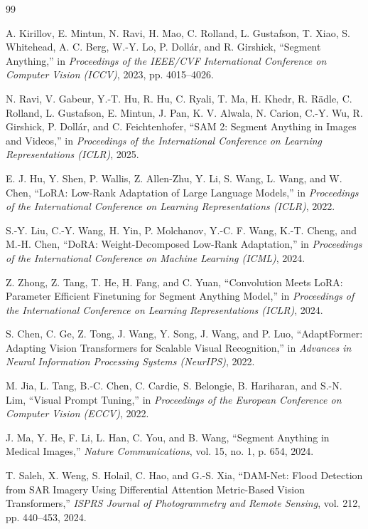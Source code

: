 \documentclass[11pt,a4paper,oneside]{report}
\begin{document}
\begin{thebibliography}{99}

A. Kirillov, E. Mintun, N. Ravi, H. Mao, C. Rolland, L. Gustafson, T. Xiao, S. Whitehead, A. C. Berg, W.-Y. Lo, P. Doll{\'a}r, and R. Girshick, ``Segment Anything,'' in \emph{Proceedings of the IEEE/CVF International Conference on Computer Vision (ICCV)}, 2023, pp. 4015--4026.

N. Ravi, V. Gabeur, Y.-T. Hu, R. Hu, C. Ryali, T. Ma, H. Khedr, R. R{\"a}dle, C. Rolland, L. Gustafson, E. Mintun, J. Pan, K. V. Alwala, N. Carion, C.-Y. Wu, R. Girshick, P. Doll{\'a}r, and C. Feichtenhofer, ``SAM 2: Segment Anything in Images and Videos,'' in \emph{Proceedings of the International Conference on Learning Representations (ICLR)}, 2025.

E. J. Hu, Y. Shen, P. Wallis, Z. Allen-Zhu, Y. Li, S. Wang, L. Wang, and W. Chen, ``LoRA: Low-Rank Adaptation of Large Language Models,'' in \emph{Proceedings of the International Conference on Learning Representations (ICLR)}, 2022.

S.-Y. Liu, C.-Y. Wang, H. Yin, P. Molchanov, Y.-C. F. Wang, K.-T. Cheng, and M.-H. Chen, ``DoRA: Weight-Decomposed Low-Rank Adaptation,'' in \emph{Proceedings of the International Conference on Machine Learning (ICML)}, 2024.

Z. Zhong, Z. Tang, T. He, H. Fang, and C. Yuan, ``Convolution Meets LoRA: Parameter Efficient Finetuning for Segment Anything Model,'' in \emph{Proceedings of the International Conference on Learning Representations (ICLR)}, 2024.

S. Chen, C. Ge, Z. Tong, J. Wang, Y. Song, J. Wang, and P. Luo, ``AdaptFormer: Adapting Vision Transformers for Scalable Visual Recognition,'' in \emph{Advances in Neural Information Processing Systems (NeurIPS)}, 2022.

M. Jia, L. Tang, B.-C. Chen, C. Cardie, S. Belongie, B. Hariharan, and S.-N. Lim, ``Visual Prompt Tuning,'' in \emph{Proceedings of the European Conference on Computer Vision (ECCV)}, 2022.

J. Ma, Y. He, F. Li, L. Han, C. You, and B. Wang, ``Segment Anything in Medical Images,'' \emph{Nature Communications}, vol. 15, no. 1, p. 654, 2024.

T. Saleh, X. Weng, S. Holail, C. Hao, and G.-S. Xia, ``DAM-Net: Flood Detection from SAR Imagery Using Differential Attention Metric-Based Vision Transformers,'' \emph{ISPRS Journal of Photogrammetry and Remote Sensing}, vol. 212, pp. 440--453, 2024.


\end{thebibliography}
\end{document}
